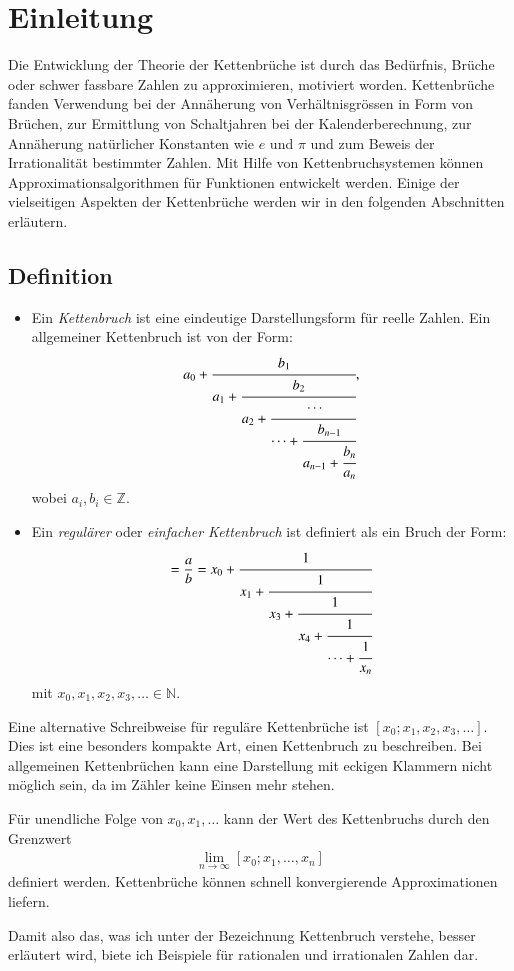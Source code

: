 %
%
%
\section{Einleitung\label{kettenbruch:section:einleitung}}
Die Entwicklung der Theorie der Kettenbrüche ist durch das Bedürfnis,
Brüche oder schwer fassbare Zahlen zu approximieren, motiviert
worden. Kettenbrüche fanden Verwendung bei der Annäherung von
Verhältnisgrössen in Form von Brüchen, zur Ermittlung von Schaltjahren
bei der Kalenderberechnung, zur Annäherung natürlicher Konstanten
wie $e$ und $\pi$ und zum Beweis der Irrationalität bestimmter
Zahlen. Mit Hilfe von Kettenbruchsystemen können Approximationsalgorithmen 
für Funktionen entwickelt werden.
Einige der vielseitigen Aspekten der Kettenbrüche
werden wir in den folgenden Abschnitten erläutern.

\subsection{Definition\label{kettenbruch:section:1s}}
\begin{itemize}
\item
Ein {\em Kettenbruch} ist eine eindeutige Darstellungsform für reelle Zahlen. 
Ein allgemeiner Kettenbruch ist von der Form:
\begin{equation}
a_0 + \cfrac{b_1}{a_1+\cfrac{b_2}{a_2+\cfrac{\cdots}{\cdots+\cfrac{b_{n-1}}{a_{n-1} + \cfrac{b_n}{a_n}}}}},
\end{equation}
wobei $a_i, b_i \in \mathbb{Z}$.
\item
Ein {\em regulärer} oder {\em einfacher Kettenbruch} ist definiert als ein
Bruch der Form:
%
%
\begin{equation*}
[x_0;x_1,x_2,\cdots,x_n]
=
\frac{a}{b}=x_0+\cfrac{1}{x_1+\cfrac{1}{x_3+\cfrac{1}{x_4+\cfrac{1}{\cdots+\cfrac{1}{x_n}}}}}
\end{equation*}
mit $x_0,x_1,x_2,x_3, \dots \in \mathbb{N}$.
\end{itemize}

Eine alternative Schreibweise für reguläre Kettenbrüche ist
$[x_0;x_1,x_2,x_3,\dots]$.
Dies ist eine besonders kompakte Art, einen Kettenbruch zu beschreiben.
Bei allgemeinen Kettenbrüchen kann eine 
Darstellung mit eckigen Klammern nicht möglich sein, da im Zähler keine Einsen
mehr stehen.


Für unendliche Folge von $x_0,x_1,\dots$ kann der Wert des Kettenbruchs
durch den Grenzwert
\begin{align*}
\lim_{n\to\infty} [x_0;x_1,\dots,x_n] 
\end{align*}  
definiert werden.
Kettenbrüche können schnell konvergierende Approximationen liefern.

Damit also das, was ich unter der Bezeichnung Kettenbruch verstehe,
besser erläutert wird, biete ich Beispiele für
rationalen und irrationalen Zahlen dar.
